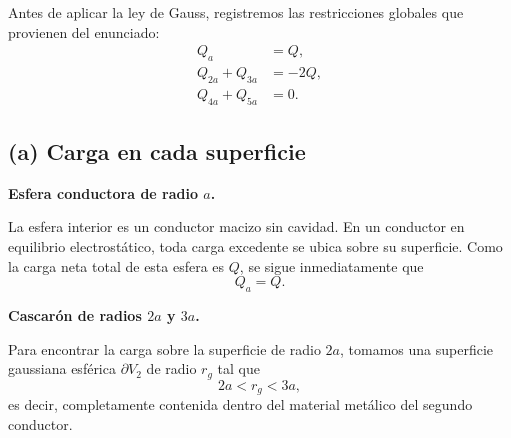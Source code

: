 \documentclass[11pt]{article}
\begin{document}
Antes de aplicar la ley de Gauss, registremos las restricciones globales que provienen del enunciado:
\begin{align*}
Q_a &= Q,\\
Q_{2a}+Q_{3a} &= -2Q,\\
Q_{4a}+Q_{5a} &= 0.
\end{align*}

\subsection*{(a) Carga en cada superficie}

\textbf{Esfera conductora de radio $a$.}

La esfera interior es un conductor macizo sin cavidad. En un conductor en equilibrio electrostático, toda carga excedente se ubica sobre su superficie. Como la carga neta total de esta esfera es $Q$, se sigue inmediatamente que
\begin{equation*}
\boxed{Q_a=Q.}
\end{equation*}

\textbf{Cascarón de radios $2a$ y $3a$.}

Para encontrar la carga sobre la superficie de radio $2a$, tomamos una superficie gaussiana esférica $\partial V_2$ de radio $r_g$ tal que
\begin{equation*}
2a<r_g<3a,
\end{equation*}
es decir, completamente contenida dentro del material metálico del segundo conductor.
\end{document}

